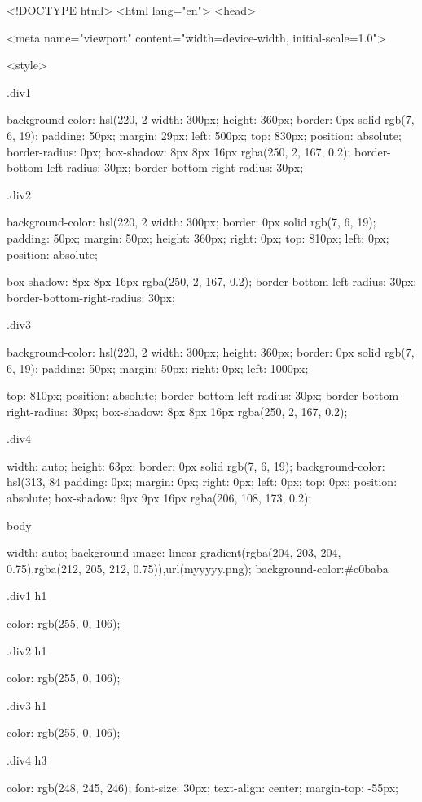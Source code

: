 <!DOCTYPE html>   
<html lang="en">
<head>
   
  <meta name="viewport" content="width=device-width, initial-scale=1.0">

<style>

.div1{

background-color: hsl(220, 2%
width: 300px;
height: 360px;
border: 0px solid rgb(7, 6, 19);
padding: 50px;
margin: 29px;
left: 500px;
top: 830px;
position: absolute;
border-radius: 0px;
box-shadow: 8px 8px 16px rgba(250, 2, 167, 0.2);
border-bottom-left-radius: 30px;
border-bottom-right-radius: 30px;


}

.div2{
  

  background-color: hsl(220, 2%
width: 300px;
border: 0px solid rgb(7, 6, 19);
padding: 50px;
margin: 50px;
height: 360px;
right: 0px;
top: 810px;
left: 0px;
position: absolute;

box-shadow: 8px 8px 16px rgba(250, 2, 167, 0.2);
border-bottom-left-radius: 30px;
border-bottom-right-radius: 30px;


}
.div3{
  

  background-color: hsl(220, 2%
  width: 300px;
    height: 360px;
  border: 0px solid rgb(7, 6, 19);
  padding: 50px;
  margin: 50px;
  right: 0px;
  left: 1000px;

top: 810px;
position: absolute;
border-bottom-left-radius: 30px;
border-bottom-right-radius: 30px;
box-shadow: 8px 8px 16px rgba(250, 2, 167, 0.2);

  
  
  }
  .div4{

  width: auto;
  height: 63px;
  border: 0px solid rgb(7, 6, 19);
  background-color: hsl(313, 84%
  padding: 0px;
  margin: 0px;
  right: 0px;
  left: 0px;
top: 0px;
position: absolute;
box-shadow: 9px 9px 16px rgba(206, 108, 173, 0.2);
  
  }

body{

  width: auto;
  background-image: linear-gradient(rgba(204, 203, 204, 0.75),rgba(212, 205, 212, 0.75)),url(myyyyy.png);
  background-color:#c0baba
}

.div1 h1{

color: rgb(255, 0, 106);


  
}
.div2 h1{

color: rgb(255, 0, 106);
  
}

.div3 h1{

color: rgb(255, 0, 106);
}
.div4 h3{
color: rgb(248, 245, 246);
font-size: 30px;
text-align: center;
margin-top: -55px;
  
}

